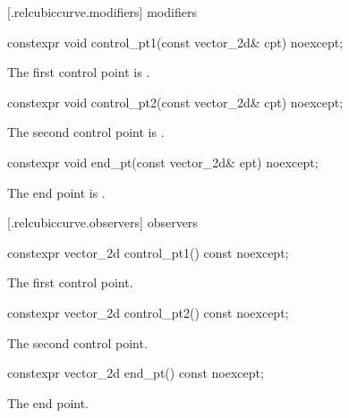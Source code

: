  [\iotwod.relcubiccurve.modifiers]{ modifiers}

%
\begin{itemdecl}
constexpr void control_pt1(const vector_2d& cpt) noexcept;
\end{itemdecl}
\begin{itemdescr}
\pnum
\effects
The first control point is .
\end{itemdescr}

%
\begin{itemdecl}
constexpr void control_pt2(const vector_2d& cpt) noexcept;
\end{itemdecl}
\begin{itemdescr}
\pnum
\effects
The second control point is .
\end{itemdescr}

%
\begin{itemdecl}
constexpr void end_pt(const vector_2d& ept) noexcept;
\end{itemdecl}
\begin{itemdescr}
\pnum
\effects
The end point is .
\end{itemdescr}

 [\iotwod.relcubiccurve.observers]{ observers}

%
\begin{itemdecl}
constexpr vector_2d control_pt1() const noexcept;
\end{itemdecl}
\begin{itemdescr}
\pnum
\returns
The first control point.
\end{itemdescr}

%
\begin{itemdecl}
constexpr vector_2d control_pt2() const noexcept;
\end{itemdecl}
\begin{itemdescr}
\pnum
\returns
The second control point.
\end{itemdescr}

%
\begin{itemdecl}
constexpr vector_2d end_pt() const noexcept;
\end{itemdecl}
\begin{itemdescr}
\pnum
\returns
The end point.
\end{itemdescr}

